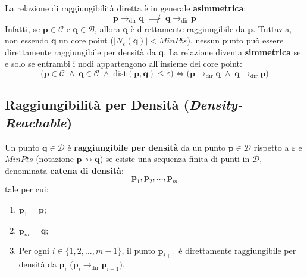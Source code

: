 \begin{property}
La relazione di raggiungibilità diretta è in generale \textbf{asimmetrica}:
\begin{equation}
    \mathbf{p} \to_{\mathrm{dir}} \mathbf{q} \;\not\implies\; \mathbf{q} \to_{\mathrm{dir}} \mathbf{p}
\end{equation}
Infatti, se $\mathbf{p} \in \mathcal{C}$ e $\mathbf{q} \in \mathcal{B}$, allora $\mathbf{q}$ è direttamente raggiungibile da $\mathbf{p}$. Tuttavia, non essendo $\mathbf{q}$ un core point ($|N_\varepsilon(\mathbf{q})| < MinPts$), nessun punto può essere direttamente raggiungibile per densità da $\mathbf{q}$. La relazione diventa \textbf{simmetrica} se e solo se entrambi i nodi appartengono all'insieme dei core point:
\begin{equation}
    \big(\mathbf{p} \in \mathcal{C} \;\land\; \mathbf{q} \in \mathcal{C} \;\land\; \mathrm{dist}(\mathbf{p}, \mathbf{q}) \le \varepsilon\big) \iff \big(\mathbf{p} \to_{\mathrm{dir}} \mathbf{q} \;\land\; \mathbf{q} \to_{\mathrm{dir}} \mathbf{p}\big)
\end{equation}
\end{property}

\subsection{Raggiungibilità per Densità (\textit{Density-Reachable})}

\begin{definition}
Un punto $\mathbf{q} \in \mathcal{D}$ è \textbf{raggiungibile per densità} da un punto $\mathbf{p} \in \mathcal{D}$ rispetto a $\varepsilon$ e $MinPts$ (notazione $\mathbf{p} \rightsquigarrow \mathbf{q}$) se esiste una sequenza finita di punti in $\mathcal{D}$, denominata \textbf{catena di densità}:
\begin{equation}
    \mathbf{p}_1, \mathbf{p}_2, \dots, \mathbf{p}_m
\end{equation}
tale per cui:
\begin{enumerate}
    \item $\mathbf{p}_1 = \mathbf{p}$;
    \item $\mathbf{p}_m = \mathbf{q}$;
    \item Per ogni $i \in \{1, 2, \dots, m-1\}$, il punto $\mathbf{p}_{i+1}$ è direttamente raggiungibile per densità da $\mathbf{p}_i$ ($\mathbf{p}_i \to_{\mathrm{dir}} \mathbf{p}_{i+1}$).
\end{enumerate}
\end{definition}

